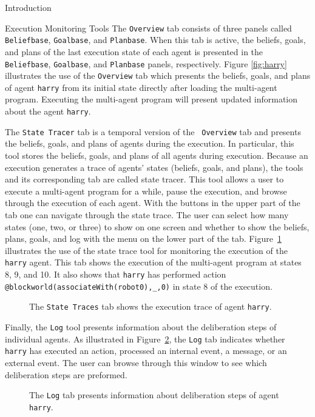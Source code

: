 \begin{chapter}{Introduction}
\begin{section}{Execution Monitoring Tools}
The {\tt Overview} tab consists of three panels called {\tt
Beliefbase}, {\tt Goalbase}, and {\tt Planbase}. When this tab is
active, the beliefs, goals, and plans of the last execution state of
each agent is presented in the {\tt Beliefbase}, {\tt Goalbase}, and
{\tt Planbase} panels, respectively. Figure \ref{fig:harry}
illustrates the use of the {\tt Overview} tab which presents the
beliefs, goals, and plans of agent {\tt harry} from its initial
state directly after loading the multi-agent program. Executing the
multi-agent program will present updated information about the agent
{\tt harry}.

The {\tt State Tracer} tab is a temporal version of the {\tt
Overview} tab and presents the beliefs, goals, and plans of agents
during the execution. In particular, this tool stores the beliefs,
goals, and plans of all agents during execution. Because an
execution generates a trace of agents' states (beliefs, goals, and
plans), the tools and its corresponding tab are called state tracer.
This tool allows a user to execute a multi-agent program for a
while, pause the execution, and browse through the execution of each
agent. With the buttons in the upper part of the tab one can
navigate through the state trace. The user can select how many
states (one, two, or three) to show on one screen and whether to
show the beliefs, plans, goals, and log with the menu on the lower
part of the tab. Figure~\ref{fig:statetracer} illustrates the use of
the state trace tool for monitoring the execution of the {\tt harry}
agent. This tab shows the execution of the multi-agent program at
states 8, 9, and 10. It also shows that {\tt harry} has performed
action {\tt @blockworld(associateWith(robot0),\_,0)} in state 8 of
the execution.

\begin{figure}
    \begin{center}
        \caption{The {\tt State Traces} tab shows the execution trace of agent {\tt harry}.}\label{fig:statetracer}
    \end{center}
\end{figure}

Finally, the {\tt Log} tool presents information about the
deliberation steps of individual agents. As illustrated in
Figure~\ref{fig:log}, the {\tt Log} tab indicates whether {\tt
harry} has executed an action, processed an internal event, a
message, or an external event. The user can browse through this
window to see which deliberation steps are preformed.

\begin{figure}
    \begin{center}
        \caption{The {\tt Log} tab presents information about deliberation steps of agent {\tt harry}.}\label{fig:log}
    \end{center}
\end{figure}

\end{section}
\end{chapter}
